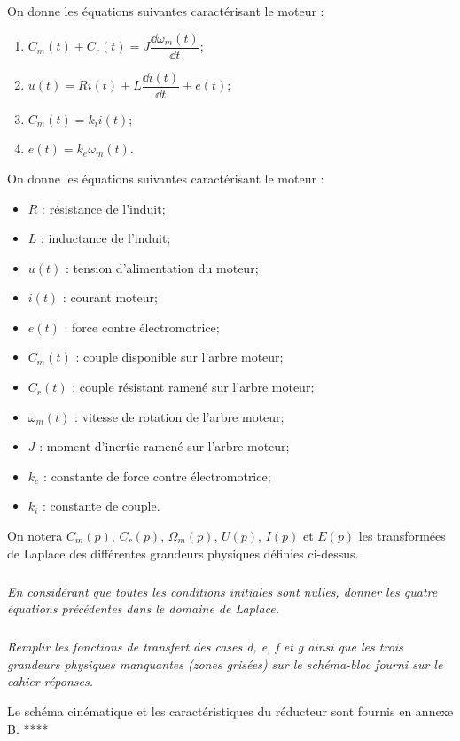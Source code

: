 \documentclass[10pt,fleqn]{article} %
\begin{document}
On donne les équations suivantes caractérisant le moteur :
\begin{multicols}{2}
\begin{enumerate}
\item $C_m(t)+C_r(t)=J\dfrac{\dd \omega_m(t)}{\dd t}$;
\item $u(t)=Ri(t)+L\dfrac{\dd i(t)}{\dd t}+e(t)$;
\item $C_m(t)=k_i i(t)$;
\item $e(t)=k_e\omega_m(t)$.
\end{enumerate}

On donne les équations suivantes caractérisant le moteur :

\begin{itemize}
\item $R$ : résistance de l'induit;
\item $L$ : inductance de l'induit;
\item $u(t)$ : tension d'alimentation du moteur;
\item $i(t)$ : courant moteur;
\item $e(t)$ : force contre électromotrice;
\item $C_m(t)$ : couple disponible sur l'arbre moteur;
\item $C_r(t)$ : couple résistant ramené sur l'arbre moteur;
\item $\omega_m(t)$ : vitesse de rotation de l'arbre moteur;
\item $J$ : moment d'inertie ramené sur l'arbre moteur;
\item $k_e$ : constante de force contre électromotrice;
\item $k_i$ : constante de couple.
\end{itemize}
\end{multicols}

On notera $C_m(p)$, $C_r(p)$, $\Omega_m(p)$, $U(p)$, $I(p)$ et $E(p)$ les transformées de Laplace des différentes grandeurs physiques définies ci-dessus.

\subparagraph{}
\textit{En considérant que toutes les conditions initiales sont nulles, donner les quatre équations précédentes dans le domaine de Laplace.}

\subparagraph{}
\textit{Remplir les fonctions de transfert des cases d, e, f et g ainsi que les trois grandeurs physiques manquantes (zones grisées) sur le schéma-bloc fourni sur le cahier réponses.}

Le schéma cinématique et les caractéristiques du réducteur sont fournis en annexe B. ****
\end{document}
